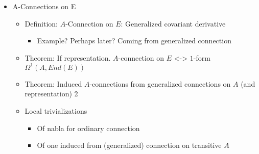 {\begin{itemize}
\begin{itemize}
\begin{itemize}
            \end{itemize}
        
        \item $P^k$ over $S^4$
        
            \begin{itemize}
            
            \item Instanton connection in $U_S$. Local trivialization in $U_N$
            
            \item Nablas in local trivialization associated to general connection
                
            \end{itemize}
        
        \end{itemize}
        
    \item A-Connections on E
    
        \begin{itemize}
            
        \item Definition: $A$-Connection on $E$: Generalized covariant derivative
        
            \begin{itemize}
            \item Example? Perhaps later? Coming from generalized connection
            \end{itemize}
        
        \item Theorem: If representation. $A$-connection on $E$ <-> $1$-form $\Omega^1(A, End(E))$
        
        \item Theorem: Induced $A$-connections from generalized connections on $A$ (and representation) 2
        
        \item Local trivializations
        
            \begin{itemize}
            
            \item Of nabla for ordinary connection
            
            \item Of one induced from (generalized) connection on transitive $A$
                
            \end{itemize}
            

\end{itemize}
\end{itemize}}
